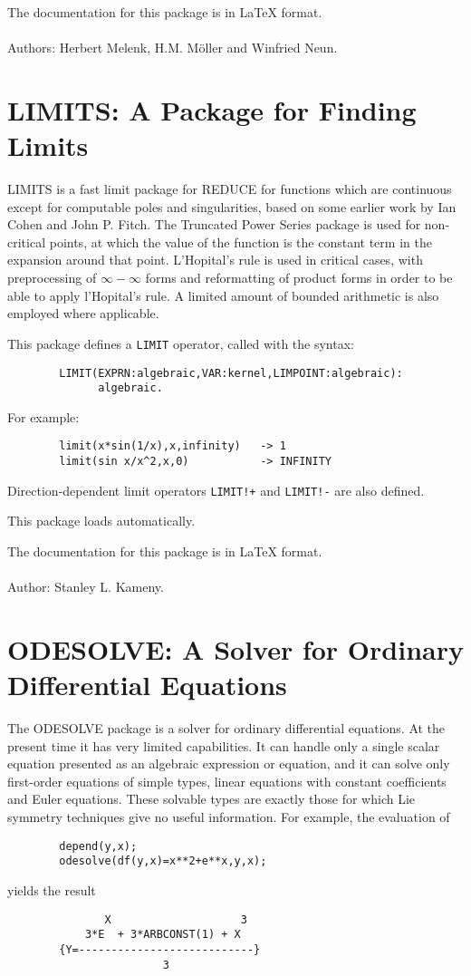The documentation for this package is in {\LaTeX} format.
\\ \\
Authors: Herbert Melenk, H.M. M\"oller and Winfried Neun.

\section{LIMITS:  A Package for Finding Limits} 

LIMITS is a fast limit package for REDUCE for functions which are
continuous except for computable poles and singularities, based on some
earlier work by Ian Cohen and John P. Fitch.  The Truncated Power Series
package is used for non-critical points, at which the value of the
function is the constant term in the expansion around that point.
L'Hopital's rule is used in critical cases, with preprocessing of
$\infty - \infty$ forms and reformatting of product forms in order to
be able to apply l'Hopital's rule.  A limited amount of bounded arithmetic
is also employed where applicable.

This package defines a {\tt LIMIT} operator, called with the syntax:
\begin{verbatim}
        LIMIT(EXPRN:algebraic,VAR:kernel,LIMPOINT:algebraic):
              algebraic.
\end{verbatim}
For example:
\begin{verbatim}
        limit(x*sin(1/x),x,infinity)   -> 1
        limit(sin x/x^2,x,0)           -> INFINITY
\end{verbatim}
Direction-dependent limit operators {\tt LIMIT!+} and {\tt LIMIT!-} are
also defined.

This package loads automatically.

The documentation for this package is in {\LaTeX} format.
\\ \\
Author: Stanley L. Kameny.

\section{ODESOLVE: A Solver for Ordinary Differential Equations}

The ODESOLVE package is a solver for ordinary differential equations.  At
the present time it has very limited capabilities.  It can handle only a
single scalar equation presented as an algebraic expression or equation,
and it can solve only first-order equations of simple types, linear
equations with constant coefficients and Euler equations.  These solvable
types are exactly those for which Lie symmetry techniques give no useful
information.  For example, the evaluation of
\begin{verbatim}
        depend(y,x);
        odesolve(df(y,x)=x**2+e**x,y,x);
\end{verbatim}
yields the result
\begin{verbatim}
               X                    3
            3*E  + 3*ARBCONST(1) + X
        {Y=---------------------------}
                        3
\end{verbatim}

